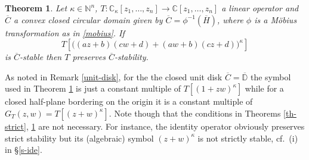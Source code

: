 \documentclass[10pt,reqno]{amsart}
\theoremstyle{plain}
\newtheorem{theorem}{Theorem}[section]
\newtheorem{corollary}[theorem]{Corollary}
\theoremstyle{definition}
\theoremstyle{remark}
\numberwithin{equation}{section}
\newcommand{\NN}{\mathbb{N}}
\newcommand{\RR}{\mathbb{R}}
\newcommand{\CC}{\mathbb{C}}
\newcommand{\DD}{\mathbb{D}}
\begin{document}
\begin{theorem}\label{th-circ-strict}
Let $\kappa \in \NN^n$, $T : \CC_\kappa[z_1,\ldots, z_n] \rightarrow 
\CC[z_1,\ldots, z_n]$ a linear operator and $\overline{C}$ a convex closed 
circular domain given by $\overline{C}=\phi^{-1}(\overline{H})$, 
where $\phi$ is a M\"obius transformation as in \eqref{mobius}. If 
$$
T\left[\big((az+b)(cw+d)+(aw+b)(cz+d) \big)^\kappa\right]
$$ 
is $\overline{C}$-stable then $T$ preserves $\overline{C}$-stability.
\end{theorem}

As noted in Remark \ref{unit-disk}, for the the closed unit disk 
$\overline{C}=\overline{\DD}$ the symbol used in 
Theorem \ref{th-circ-strict} is just a constant multiple of 
$T[(1+zw)^{\kappa}]$ while for a closed half-plane
bordering on the origin it is a constant multiple of 
$G_T(z,w)=T[(z+w)^\kappa]$. Note though that the conditions in 
Theorems \ref{th-strict}, \ref{th-circ-strict} are not necessary. For 
instance, the identity operator obviously preserves strict stability but its
(algebraic) symbol $(z+w)^\kappa$ is not strictly stable, cf.~(i) in 
\S \ref{s-ide}.


%



\end{document}
